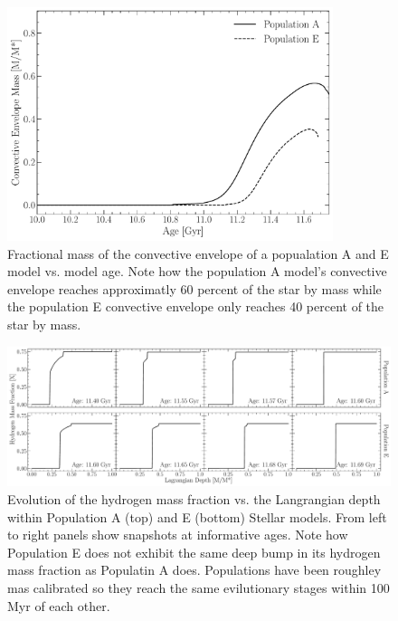 \begin{figure}
  \centering
  \includegraphics[width=0.85\textwidth]{figures/rgbb/ConvectiveEnvelopeMass.pdf}
  \caption{Fractional mass of the convective envelope of a popualation A and E
  model vs. model age. Note how the population A model's convective envelope
  reaches approximatly 60 percent of the star by mass while the population E
  convective envelope only reaches 40 percent of the star by mass.}
  \label{fig:convEnvMass}
\end{figure}

\begin{figure}
    \centering
    \includegraphics[width=\textwidth]{figures/rgbb/EvolutionAE.pdf}
    \caption{Evolution of the hydrogen mass fraction vs. the Langrangian depth within Population A (top) and E (bottom) Stellar models. From left to right panels show snapshots at informative ages. Note how Population E does not exhibit the same deep bump in its hydrogen mass fraction as Populatin A does. Populations have been roughley mas calibrated so they reach the same evilutionary stages within 100 Myr of each other.}
    \label{fig:MfracVX}
\end{figure}
